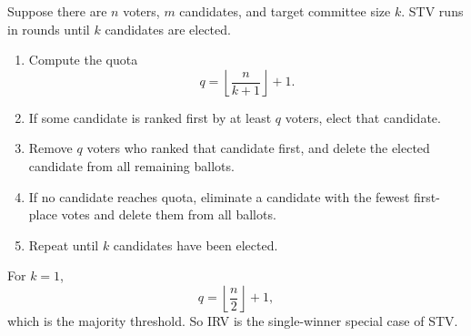 \begin{defbox}[STV]
Suppose there are $n$ voters, $m$ candidates, and target committee size $k$. STV runs in rounds until $k$ candidates are elected.
\end{defbox}

\begin{thmbox}
\begin{enumerate}
  \item Compute the quota
  \[
    q = \left\lfloor \frac{n}{k+1} \right\rfloor + 1.
  \]
  \item If some candidate is ranked first by at least $q$ voters, elect that candidate.
  \item Remove $q$ voters who ranked that candidate first, and delete the elected candidate from all remaining ballots.
  \item If no candidate reaches quota, eliminate a candidate with the fewest first-place votes and delete them from all ballots.
  \item Repeat until $k$ candidates have been elected.
\end{enumerate}
\end{thmbox}

\begin{tipbox}
For $k=1$,
\[
  q = \left\lfloor \frac{n}{2} \right\rfloor + 1,
\]
which is the majority threshold. So IRV is the single-winner special case of STV.
\end{tipbox}

